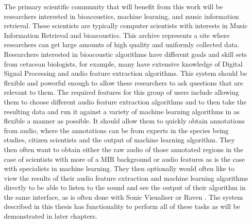 \documentclass[12pt,oneside]{book}
\begin{document}
The primary scientific community that will benefit from this work will
be researchers interested in bioacoustics, machine learning, and music
information retrieval.  These scientists are typically computer
scientists with interests in Music Information Retrieval and
bioacoustics.  This archive represents a site where researchers can
get large amounts of high quality and uniformly collected data.
Researchers interested in bioacoustic algorithms have different goals
and skill sets from cetacean biologists, for example, many have
extensive knowledge of Digital Signal Processing and audio feature
extraction algorithms.  This system should be flexible and powerful
enough to allow these researchers to ask questions that are relevant
to them.  The required features for this group of users include
allowing them to choose different audio feature extraction algorithms
and to then take the resulting data and run it against a variety of
machine learning algorithms in as flexible a manner as possible.  It
should allow them to quickly obtain annotations from audio, where the
annotations can be from experts in the species being studies, citizen
scientists and the output of machine learning algorithm.  They then
often want to obtain either the raw audio of those annotated regions
in the case of scientists with more of a MIR background or audio
features as is the case with specialists in machine learning.  They
then optionally would often like to view the results of their audio
feature extraction and machine learning algorithms directly to be able
to listen to the sound and see the output of their algorithm in the
same interface, as is often done with Sonic Visualiser
\cite{cannam2010sonic} or Raven \cite{ravenpro}.  The system described
in this thesis has functionality to perform all of these tasks as will
be demonstrated in later chapters.
\end{document}
